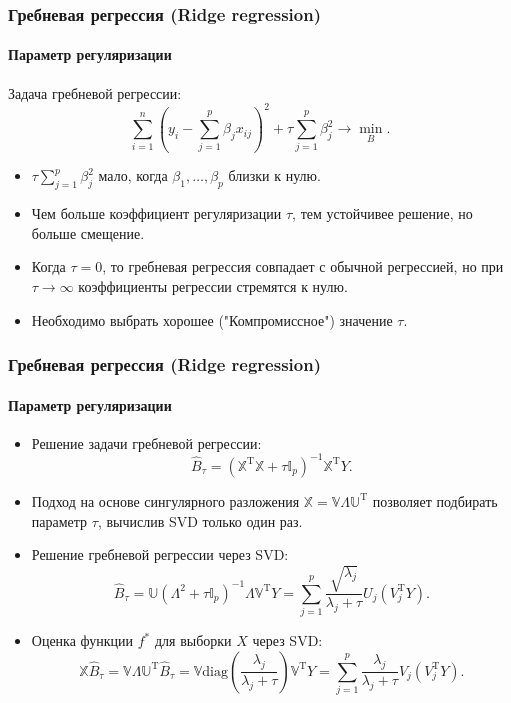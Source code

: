 \documentclass[10pt,unicode, notheorems]{beamer}
\DeclareMathOperator{\T}{T}
\begin{document}
\begin{frame}
\frametitle{Гребневая регрессия (Ridge regression)}
\framesubtitle{Параметр регуляризации}
Задача гребневой регрессии:
\begin{equation*}
\sum_{i=1}^{n}
\left(
y_{i}
-
\sum_{j=1}^{p}\beta_{j}x_{ij}
\right)^{2}
+
\tau\sum_{j=1}^{p}\beta_{j}^{2}
\rightarrow\min_{B}.
\end{equation*}
\begin{itemize}
\item $\tau\sum_{j = 1}^p \beta_j^2$ мало, когда $\beta_1, \ldots, \beta_p$ близки к нулю.
\item Чем больше коэффициент регуляризации $\tau$, тем устойчивее решение, но больше смещение.
\item Когда $\tau = 0$, то гребневая регрессия совпадает с обычной регрессией, но при $\tau \rightarrow \infty$ коэффициенты регрессии стремятся к нулю.
\item Необходимо выбрать хорошее ("Компромиссное") значение $\tau$.
\end{itemize}
\end{frame}



\begin{frame}
\frametitle{Гребневая регрессия (Ridge regression)}
\framesubtitle{Параметр регуляризации}
 
 \begin{itemize}
 \item  Решение задачи гребневой регрессии:
\begin{equation*}
\hat{B}_{\tau}
=
(\mathbb{X}^{\mathrm{T}}\mathbb{X}+\tau\mathbb{I}_{p})^{-1}\mathbb{X}^{\mathrm{T}}Y.
\end{equation*}
 \item Подход на основе сингулярного разложения $\mathbb{X}=\mathbb{V}\mathbb{\Lambda}\mathbb{U^{\mathrm{T}}}$ позволяет подбирать параметр $\tau$, вычислив SVD только один раз.
 \item Решение гребневой регрессии через SVD:
\begin{equation*}
\hat{B}_{\tau} = \mathbb{U}(\mathbb{\Lambda}^2 +\tau \mathbb{I}_{p})^{-1}\mathbb{\Lambda}\mathbb{V}^{\T}Y 
= \sum_{j=1}^p \frac{\sqrt{\lambda_j}}{\lambda_j + \tau} U_j(V_j^{\T}Y).
\end{equation*}
 \item Оценка функции $f^{\ast}$ для выборки $X$ через SVD:
\begin{equation*}
\mathbb{X}\hat{B}_{\tau} = \mathbb{V}\mathbb{\Lambda}\mathbb{U}^{\T}\hat{B}_{\tau} = \mathbb{V} \mathrm{diag}(\frac{\lambda_j}{\lambda_j + \tau})\mathbb{V}^{\T}Y = \sum_{j=1}^p \frac{\lambda_j}{\lambda_j + \tau} V_j(V_j^{\T}Y).
\end{equation*}
 \end{itemize}

\end{frame}
\end{document}
